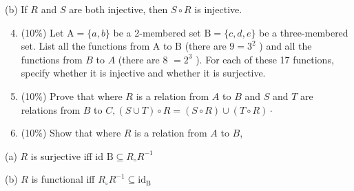 \documentclass[10pt]{article}
\begin{document}
(b) If $R$ and $S$ are both injective, then $S \circ R$ is injective.

\begin{enumerate}
  \setcounter{enumi}{3}
  \item (10\%) Let $\mathrm{A}=\{a, b\}$ be a 2-membered set $\mathrm{B}=\{c, d, e\}$ be a three-membered set. List all the functions from A to B (there are $9=3^{2}$ ) and all the functions from $B$ to $A$ (there are 8 $=2^{3}$ ). For each of these 17 functions, specify whether it is injective and whether it is surjective.

  \item (10\%) Prove that where $R$ is a relation from $A$ to $B$ and $S$ and $T$ are relations from $B$ to $C,(S \cup T) \circ R=(S \circ R) \cup(T \circ R) \cdot$

  \item (10\%) Show that where $R$ is a relation from $A$ to $B$,

\end{enumerate}
(a) $R$ is surjective iff id $\mathrm{B} \subseteq R_{\circ} R^{-1}$

(b) $R$ is functional iff $R_{\circ} R^{-1} \subseteq \mathrm{id}_{\mathrm{B}}$
\end{document}
